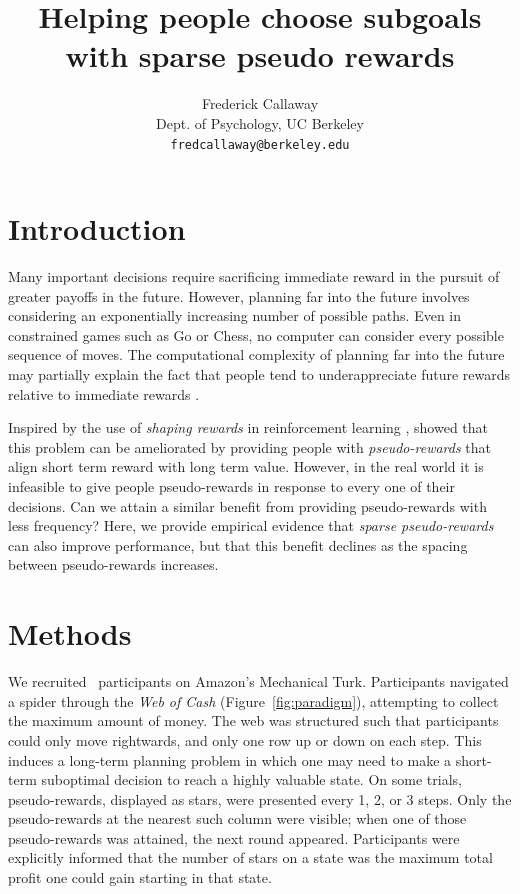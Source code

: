 \documentclass[10pt,letterpaper]{article}
\title{Helping people choose subgoals with sparse pseudo rewards}
\author{
Frederick Callaway \\
Dept. of Psychology, UC Berkeley\\
\texttt{fredcallaway@berkeley.edu} \\
}
\begin{document}


\maketitle


\section{Introduction}\label{introduction}

Many important decisions require sacrificing immediate reward in the pursuit of greater payoffs in the future. However, planning far into the future involves considering an exponentially increasing number of possible paths. Even in constrained games such as Go or Chess, no computer can consider every possible sequence of moves. The computational complexity of planning far into the future may partially explain the fact that people tend to underappreciate future rewards relative to immediate rewards \cite{Myerson1995}.

Inspired by the use of \emph{shaping rewards} in reinforcement learning \cite{ng99},  showed that this problem can be ameliorated by providing people with \emph{pseudo-rewards} that align short term reward with long term value. However, in the real world it is infeasible to give people pseudo-rewards in response to every one of their decisions. Can we attain a similar benefit from providing pseudo-rewards with less frequency? Here, we provide empirical evidence that \emph{sparse pseudo-rewards} can also improve performance, but that this benefit declines as the spacing between pseudo-rewards increases.



\section{Methods} %
\label{methods}
We recruited \NParticipant~participants on Amazon's Mechanical Turk. Participants navigated a spider through the \emph{Web of Cash} (Figure~\ref{fig:paradigm}), attempting to collect the maximum amount of money. The web was structured such that participants could only move rightwards, and only one row up or down on each step. This induces a long-term planning problem in which one may need to make a short-term suboptimal decision to reach a highly valuable state. On some trials, pseudo-rewards, displayed as stars, were presented every 1, 2, or 3 steps. Only the pseudo-rewards at the nearest such column were visible; when one of those pseudo-rewards was attained, the next round appeared. Participants were explicitly informed that the number of stars on a state was the maximum total profit one could gain starting in that state.
\end{document}
